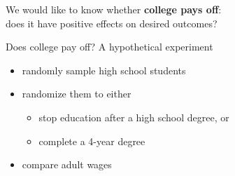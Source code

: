 \documentclass{beamer}
\begin{document}

\begin{frame}

We would like to know whether \textbf{college pays off}:\\
does it have positive effects on desired outcomes?

\end{frame}

\begin{frame}{Does college pay off? A hypothetical experiment} \pause

\begin{itemize}
\item randomly sample high school students \pause
\item randomize them to either
\begin{itemize}
\item stop education after a high school degree, or
\item complete a 4-year degree \pause
\end{itemize}
\item compare adult wages
\end{itemize}

\end{frame}
\end{document}
